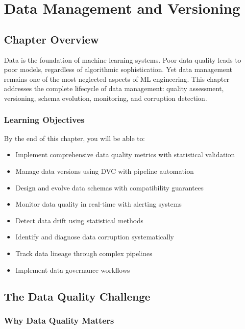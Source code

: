 \chapter{Data Management and Versioning}
\label{ch:data_management}

\section{Chapter Overview}

Data is the foundation of machine learning systems. Poor data quality leads to poor models, regardless of algorithmic sophistication. Yet data management remains one of the most neglected aspects of ML engineering. This chapter addresses the complete lifecycle of data management: quality assessment, versioning, schema evolution, monitoring, and corruption detection.

\subsection{Learning Objectives}

By the end of this chapter, you will be able to:

\begin{itemize}
    \item Implement comprehensive data quality metrics with statistical validation
    \item Manage data versions using DVC with pipeline automation
    \item Design and evolve data schemas with compatibility guarantees
    \item Monitor data quality in real-time with alerting systems
    \item Detect data drift using statistical methods
    \item Identify and diagnose data corruption systematically
    \item Track data lineage through complex pipelines
    \item Implement data governance workflows
\end{itemize}

\section{The Data Quality Challenge}

\subsection{Why Data Quality Matters}

